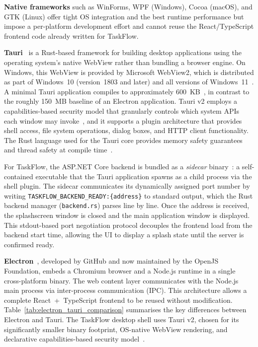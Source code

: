 \textbf{Native frameworks} such as WinForms, WPF (Windows), Cocoa (macOS), and GTK
(Linux) offer tight OS integration and the best runtime performance but impose a
per-platform development effort and cannot reuse the React/TypeScript frontend code
already written for TaskFlow.

\textbf{Tauri}~\cite{tauri_docs} is a Rust-based framework for building desktop
applications using the operating system's native WebView rather than bundling
a browser engine.
On Windows, this WebView is provided by Microsoft WebView2, which is distributed
as part of Windows~10 (version~1803 and later) and all versions of
Windows~11~\cite{webview2}.
A minimal Tauri application compiles to approximately 600~KB~\cite{tauri_docs},
in contrast to the roughly 150~MB baseline of an Electron application.
Tauri v2 employs a capabilities-based security model that granularly controls
which system APIs each window may invoke~\cite{tauri_security}, and it supports
a plugin architecture that provides shell access, file system operations,
dialog boxes, and HTTP client functionality.
The Rust language used for the Tauri core provides memory safety guarantees
and thread safety at compile time~\cite{rust_lang}.

For TaskFlow, the ASP.NET Core backend is bundled as a \emph{sidecar}
binary~\cite{tauri_sidecar}: a self-contained executable that the Tauri
application spawns as a child process via the shell plugin.
The sidecar communicates its dynamically assigned port number by writing
\texttt{TASKFLOW\_BACKEND\_}\cbrk\texttt{READY:\{address\}} to standard output, which the
Rust backend manager (\texttt{backend.rs}) parses line by line.
Once the address is received, the splashscreen window is closed and the main
application window is displayed.
This stdout-based port negotiation protocol decouples the frontend load
from the backend start time, allowing the UI to display a splash state
until the server is confirmed ready.

\textbf{Electron}~\cite{electrondocs2024}, developed by GitHub and now maintained by
the OpenJS Foundation, embeds a Chromium browser and a Node.js runtime in a single
cross-platform binary.
The web content layer communicates with the Node.js main process via inter-process
communication (IPC).
This architecture allows a complete React~+~TypeScript frontend to be reused without
modification.
Table~\ref{tab:electron_tauri_comparison} summarises the key differences between
Electron and Tauri.
The TaskFlow desktop shell uses Tauri v2, chosen for its significantly smaller
binary footprint, OS-native WebView rendering, and declarative capabilities-based
security model~\cite{tauri_security}.

